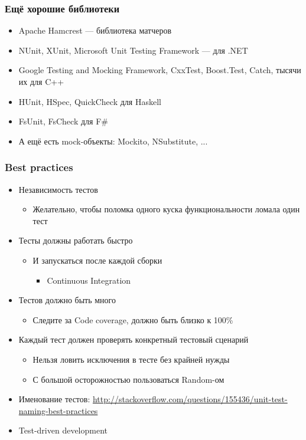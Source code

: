 \documentclass[xetex,mathserif,serif]{beamer}
\begin{document}
	\begin{frame}
		\frametitle{Ещё хорошие библиотеки}
		\begin{itemize}
			\item Apache Hamcrest --- библиотека матчеров
			\item NUnit, XUnit, Microsoft Unit Testing Framework --- для .NET
			\item Google Testing and Mocking Framework, CxxTest, Boost.Test, Catch, тысячи их для C++
			\item HUnit, HSpec, QuickCheck для Haskell
			\item FsUnit, FsCheck для F\#
			\item А ещё есть mock-объекты: Mockito, NSubstitute, ...
		\end{itemize}
	\end{frame}

	\begin{frame}
		\frametitle{Best practices}
		\begin{itemize}
			\item Независимость тестов
			\begin{itemize}
				\item Желательно, чтобы поломка одного куска функциональности ломала один тест
			\end{itemize}
			\item Тесты должны работать быстро
			\begin{itemize}
				\item И запускаться после каждой сборки
				\begin{itemize}
					\item Continuous Integration
				\end{itemize}
			\end{itemize}
			\item Тестов должно быть много
			\begin{itemize}
				\item Следите за Code coverage, должно быть близко к 100\%
			\end{itemize}
			\item Каждый тест должен проверять конкретный тестовый сценарий
			\begin{itemize}
				\item Нельзя ловить исключения в тесте без крайней нужды
				\item С большой осторожностью пользоваться Random-ом
			\end{itemize}
			\item Именование тестов: \url{http://stackoverflow.com/questions/155436/unit-test-naming-best-practices}
			\item Test-driven development
		\end{itemize}
	\end{frame}
\end{document}
